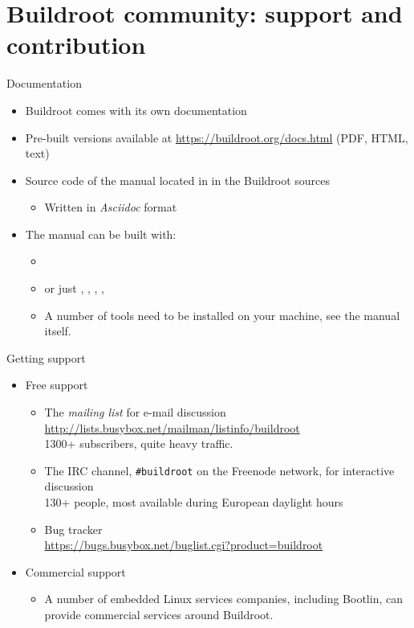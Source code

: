 \section{Buildroot community: support and contribution}

\begin{frame}{Documentation}
  \begin{itemize}
  \item Buildroot comes with its own documentation
  \item Pre-built versions available at
    \url{https://buildroot.org/docs.html} (PDF, HTML, text)
  \item Source code of the manual located in  in the
    Buildroot sources
    \begin{itemize}
    \item Written in {\em Asciidoc} format
    \end{itemize}
  \item The manual can be built with:
    \begin{itemize}
    \item {}
    \item or just , ,
      , , 
    \item A number of tools need to be installed on your machine,
      see the manual itself.
    \end{itemize}
  \end{itemize}
\end{frame}

\begin{frame}{Getting support}
  \begin{itemize}
  \item Free support
    \begin{itemize}
    \item The {\em mailing list} for e-mail discussion\\
      {\footnotesize \url{http://lists.busybox.net/mailman/listinfo/buildroot}}\\
      1300+ subscribers, quite heavy traffic.
    \item The IRC channel, {\tt \#buildroot} on the Freenode network,
      for interactive discussion\\
      130+ people, most available during European daylight hours
    \item Bug tracker\\
      \url{https://bugs.busybox.net/buglist.cgi?product=buildroot}
    \end{itemize}
  \item Commercial support
    \begin{itemize}
    \item A number of embedded Linux services companies, including
      Bootlin, can provide commercial services around
      Buildroot.
    \end{itemize}
  \end{itemize}
\end{frame}

